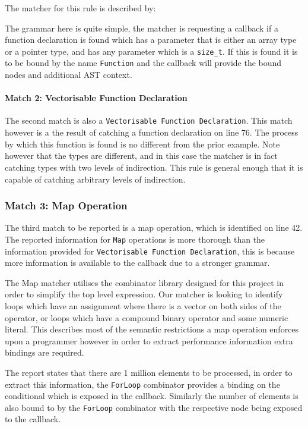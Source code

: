 The matcher for this rule is described by:

The grammar here is quite simple, the matcher is requesting a callback if a function declaration is
found which has a parameter that is either an array type or a pointer type, and has any parameter
which is a \lstinline{size_t}. If this is found it is to be bound by the name \lstinline{Function}
and the callback will provide the bound nodes and additional AST context.

\paragraph{Match 2: Vectorisable Function Declaration}
The second match is also a \lstinline{Vectorisable Function Declaration}. This match however is a
the result of catching a function declaration on line 76. The process by which this function is
found is no different from the prior example. Note however that the types are different, and in this
case the matcher is in fact catching types with two levels of indirection. This rule is general
enough that it is capable of catching arbitrary levels of indirection.

\subsubsection{Match 3: Map Operation}
The third match to be reported is a map operation, which is identified on line 42. The reported
information for \lstinline{Map} operations is more thorough than the information provided for
\lstinline{Vectorisable Function Declaration}, this is because more information is available to the
callback due to a stronger grammar.

The Map matcher utilises the combinator library designed for this project in order to simplify the
top level expression. Our matcher is looking to identify loops which have an assignment where there
is a vector on both sides of the operator, or loops which have a compound binary operator and some
numeric literal. This describes most of the semantic restrictions a map operation enforces upon a
programmer however in order to extract performance information extra bindings are required.

The report states that there are 1 million elements to be processed, in order to extract this
information, the \lstinline{ForLoop} combinator provides a binding on the conditional which is
exposed in the callback. Similarly the number of elements is also bound to by the \lstinline{ForLoop}
combinator with the respective node being exposed to the callback.

